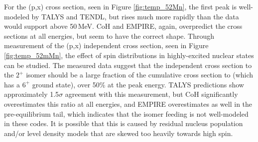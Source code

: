 %
For the (p,x) cross section, seen in Figure \autoref{fig:temp_52Mn},  the first peak is well-modeled by TALYS and TENDL, but  rises much more rapidly than the data would support above 50\,MeV.
CoH and EMPIRE, again, overpredict the cross sections at all energies, but seem to have the correct shape.
Through measurement of the  (p,x) independent cross section, seen in Figure \autoref{fig:temp_52mMn}, the effect of spin distributions in highly-excited nuclear states can be studied.
The measured data suggest that the independent cross section to the $2^+$ isomer should be a large fraction of the cumulative cross section to  (which has a $6^+$ ground state), over 50\% at the peak energy.
TALYS predictions show approximately 1.5$\sigma$ agreement with this measurement, but CoH significantly overestimates this ratio at all energies, and EMPIRE overestimates as well in the pre-equilibrium tail,   
which indicates that the isomer feeding is not well-modeled in these codes.
It is possible that this is caused by residual nucleus population and/or level density models that are skewed too heavily towards high spin.






